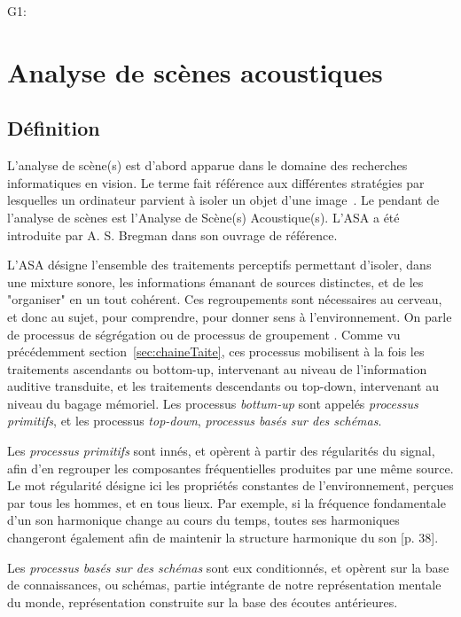 G1: \citep{ballas1987interpreting,niessen2008disambiguating,gygi2011incongruency} \\


\section{Analyse de scènes acoustiques}
\label{sec:ch3_ASA}

\subsection{Définition}
\label{sec:ASAintro}

L'analyse de scène(s) est d'abord apparue dans le domaine des recherches informatiques en vision. Le terme fait référence aux différentes stratégies par lesquelles un ordinateur parvient à isoler un objet d'une image~\citep[p. 12]{mcadams1994penser}. Le pendant  de l'analyse de scènes est l'Analyse de Scène(s) Acoustique(s). L'ASA a été introduite par A. S. Bregman dans son ouvrage de référence\citep{bregman1994auditory}.

L'ASA désigne l'ensemble des traitements perceptifs permettant d'isoler, dans une mixture sonore, les informations émanant de sources distinctes, et de les "organiser" en un tout cohérent. Ces regroupements sont nécessaires au cerveau, et donc au sujet, pour comprendre, pour donner sens à l'environnement. On parle de processus de ségrégation ou de processus de groupement \citep{winkler2009modeling}. Comme vu précédemment section~\ref{sec:chaineTaite}, ces processus mobilisent à la fois les traitements ascendants ou bottom-up, intervenant au niveau de l'information auditive transduite, et les traitements descendants ou top-down, intervenant au niveau du bagage mémoriel. Les processus \emph{bottum-up} sont appelés \emph{processus primitifs}, et les processus  \emph{top-down}, \emph{processus basés sur des schémas}. 

Les \emph{processus primitifs} sont innés, et opèrent à partir des régularités du signal, afin d'en regrouper les composantes fréquentielles produites par une même source. Le mot régularité désigne ici les propriétés constantes de l'environnement, perçues par tous les hommes, et en tous lieux. Par exemple, si la fréquence fondamentale d'un son harmonique change au cours du temps, toutes ses harmoniques changeront également afin de maintenir la structure harmonique du son [p. 38]\citep{bregman1994auditory}.

Les \emph{processus basés sur des schémas} sont eux conditionnés, et opèrent sur la base de connaissances, ou schémas, partie intégrante de notre représentation mentale du monde, représentation construite sur la base des écoutes antérieures. 
 
